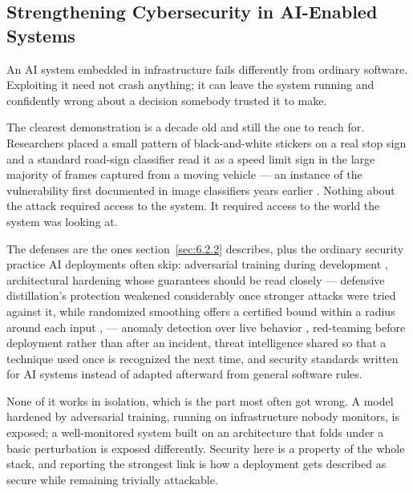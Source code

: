 \subsection{Strengthening Cybersecurity in AI-Enabled Systems}
\label{sec:8.5.2}
An AI system embedded in infrastructure fails differently from ordinary software. Exploiting it need not crash anything; it can leave the system running and confidently wrong about a decision somebody trusted it to make.

The clearest demonstration is a decade old and still the one to reach for. Researchers placed a small pattern of black-and-white stickers on a real stop sign and a standard road-sign classifier read it as a speed limit sign in the large majority of frames captured from a moving vehicle \autocite{eykholt2018robust} — an instance of the vulnerability first documented in image classifiers years earlier \autocite{szegedy2013intriguing}. Nothing about the attack required access to the system. It required access to the world the system was looking at.

The defenses are the ones section~\ref{sec:6.2.2} describes, plus the ordinary security practice AI deployments often skip: adversarial training during development \autocite{goodfellow2014explaining}, architectural hardening whose guarantees should be read closely — defensive distillation's protection weakened considerably once stronger attacks were tried against it, while randomized smoothing offers a certified bound within a radius around each input \autocite{carlini2016defensive}, \autocite{cohen2019certified} — anomaly detection over live behavior \autocite{darktrace2014enterprise}, red-teaming before deployment rather than after an incident, threat intelligence shared so that a technique used once is recognized the next time, and security standards written for AI systems instead of adapted afterward from general software rules.

None of it works in isolation, which is the part most often got wrong. A model hardened by adversarial training, running on infrastructure nobody monitors, is exposed; a well-monitored system built on an architecture that folds under a basic perturbation is exposed differently. Security here is a property of the whole stack, and reporting the strongest link is how a deployment gets described as secure while remaining trivially attackable.
